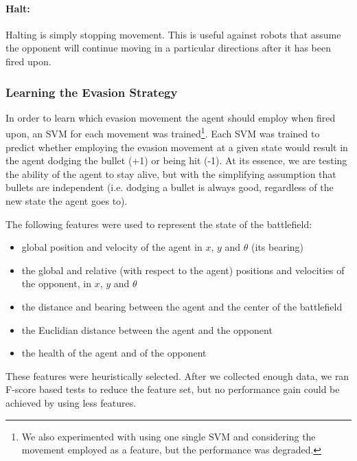 \documentclass{article}
\theoremstyle{plain}
\theoremstyle{definition}
\theoremstyle{remark}
\begin{document}
\paragraph{Halt:}
Halting is simply stopping movement. This is useful against robots that assume the opponent will continue moving in a particular directions after it has been fired upon.

\subsubsection*{Learning the Evasion Strategy}
In order to learn which evasion movement the agent should employ when fired upon, an SVM for each movement was trained\footnote{We also experimented with using one single SVM and considering the movement employed as a feature, but the performance was degraded.}. Each SVM was trained to predict whether employing the evasion movement at a given state would result in the agent dodging the bullet (+1) or being hit (-1). At its essence, we are testing the ability of the agent to stay alive, but with the simplifying assumption that bullets are independent (i.e. dodging a bullet is always good, regardless of the new state the agent goes to).
 
The following features were used to represent the state of the battlefield:

\begin{itemize}
	\item global position and velocity of the agent in $x$, $y$ and $\theta$ (its bearing)
	\item the global and relative (with respect to the agent) positions  and velocities of the opponent, in $x$, $y$ and $\theta$
	\item the distance and bearing between the agent and the center of the battlefield
	\item the Euclidian distance between the agent and the opponent
	\item the health of the agent and of the opponent
\end{itemize}

These features were heuristically selected. After we collected enough data, we ran F-score based tests\cite{Chen05combiningsvms} to reduce the feature set, but no performance gain could be achieved by using less features.
\end{document}
